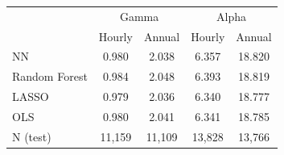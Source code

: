 \begin{tabular}{lcc|cc}
\hline\hline
 & \multicolumn{2}{c|}{Gamma} & \multicolumn{2}{c}{Alpha} \\
 & Hourly & Annual & Hourly & Annual \\
\hline
NN & 0.980 & 2.038 & 6.357 & 18.820 \\
Random Forest & 0.984 & 2.048 & 6.393 & 18.819 \\
LASSO & 0.979 & 2.036 & 6.340 & 18.777 \\
OLS & 0.980 & 2.041 & 6.341 & 18.785 \\
\hline
N (test) & 11,159 & 11,109 & 13,828 & 13,766 \\
\hline\hline
\end{tabular}

